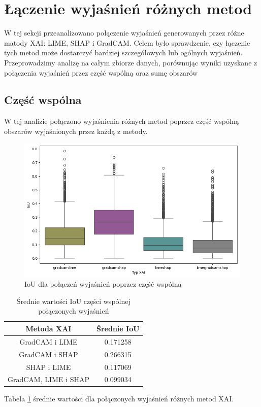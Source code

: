 \section*{Łączenie wyjaśnień różnych metod}
W tej sekcji przeanalizowano połączenie wyjaśnień generowanych przez różne matody XAI: LIME, SHAP i GradCAM.
Celem było sprawdzenie, czy łączenie tych metod może dostarczyć bardziej szczegółowych lub ogólnych wyjaśnień.
Przeprowadzimy analizę na całym zbiorze danych, porównując wyniki uzyskane z połączenia wyjaśnień przez część wspólną oraz sumę obszarów

\subsection*{Część wspólna}
W tej analizie połączono wyjaśnienia różnych metod poprzez część wspólną obszarów wyjaśnionych przez każdą z metody.

\begin{figure}
	\centering\includegraphics[width=.6\textwidth]{img/combine_iou_and}
	\caption{IoU dla połączeń wyjaśnień poprzez część wspólną}  \label{rys:combine_iou_and}
\end{figure}
\begin{table}
	\centering
	\begin{tabular}{|c|c|}
		\hline
		\textbf{Metoda XAI}  & Średnie IoU \\
		\hline
		GradCAM i LIME       & 0.171258    \\
		\hline
		GradCAM i SHAP       & 0.266315    \\
		\hline
		SHAP i LIME          & 0.117069    \\
		\hline
		GradCAM, LIME i SHAP & 0.099034    \\
		\hline
	\end{tabular}
	\caption{Średnie wartości IoU części wspólnej połączonych wyjaśnień}
	\label{tab:combineandiouand}
\end{table}
Tabela \ref{tab:combineandiouand} średnie wartości dla połączonych wyjaśnień różnych metod XAI.

